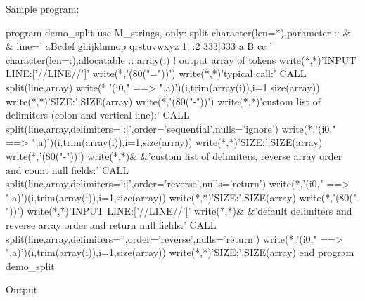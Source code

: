 Sample program\+: \begin{DoxyVerb} program demo_split
 use M_strings, only: split
 character(len=*),parameter     :: &
 & line='  aBcdef   ghijklmnop qrstuvwxyz  1:|:2     333|333 a B cc    '
 character(len=:),allocatable :: array(:) ! output array of tokens
    write(*,*)'INPUT LINE:['//LINE//']'
    write(*,'(80("="))')
    write(*,*)'typical call:'
    CALL split(line,array)
    write(*,'(i0," ==> ",a)')(i,trim(array(i)),i=1,size(array))
    write(*,*)'SIZE:',SIZE(array)
    write(*,'(80("-"))')
    write(*,*)'custom list of delimiters (colon and vertical line):'
    CALL split(line,array,delimiters=':|',order='sequential',nulls='ignore')
    write(*,'(i0," ==> ",a)')(i,trim(array(i)),i=1,size(array))
    write(*,*)'SIZE:',SIZE(array)
    write(*,'(80("-"))')
    write(*,*)&
  &'custom list of delimiters, reverse array order and count null fields:'
    CALL split(line,array,delimiters=':|',order='reverse',nulls='return')
    write(*,'(i0," ==> ",a)')(i,trim(array(i)),i=1,size(array))
    write(*,*)'SIZE:',SIZE(array)
    write(*,'(80("-"))')
    write(*,*)'INPUT LINE:['//LINE//']'
    write(*,*)&
    &'default delimiters and reverse array order and return null fields:'
    CALL split(line,array,delimiters='',order='reverse',nulls='return')
    write(*,'(i0," ==> ",a)')(i,trim(array(i)),i=1,size(array))
    write(*,*)'SIZE:',SIZE(array)
 end program demo_split
\end{DoxyVerb}


Output

